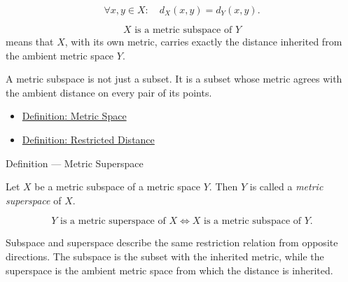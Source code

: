 \begin{remark*}
\[
  \forall x,y\in X{:}\quad d_X(x,y)=d_Y(x,y).
\]
\end{remark*}

\begin{remark*}
\[
X\text{ is a metric subspace of }Y
\]
means that \(X\), with its own metric, carries exactly the distance inherited
from the ambient metric space \(Y\).
\end{remark*}

\begin{remark*}[Interpretation]
A metric subspace is not just a subset.  It is a subset whose metric agrees
with the ambient distance on every pair of its points.
\end{remark*}


\begin{dependencies}
\begin{itemize}
  \item \hyperref[def:metric-space]{Definition: Metric Space}
  \item \hyperref[def:metric-restricted-distance]{Definition: Restricted Distance}
\end{itemize}
\end{dependencies}

\begin{definitionbox}{Definition --- Metric Superspace}
\begin{definition}\label{def:metric-superspace}
Let \(X\) be a metric subspace of a metric space \(Y\).  Then \(Y\) is called
a \emph{metric superspace} of \(X\).
\end{definition}
\end{definitionbox}

\begin{remark*}
\[
Y\text{ is a metric superspace of }X
\Longleftrightarrow
X\text{ is a metric subspace of }Y.
\]
\end{remark*}

\begin{remark*}[Interpretation]
Subspace and superspace describe the same restriction relation from opposite
directions.  The subspace is the subset with the inherited metric, while the
superspace is the ambient metric space from which the distance is inherited.
\end{remark*}

